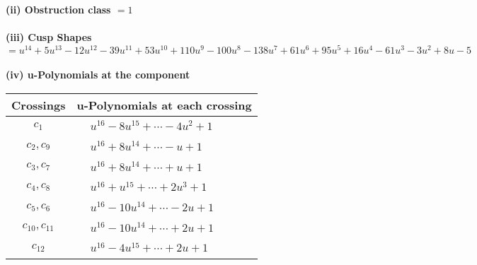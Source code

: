 \documentclass[1p]{elsarticle_modified}
\theoremstyle{definition}
\begin{document}
\flushleft \textbf{(ii) Obstruction class $= 1$}\\~\\
\flushleft \textbf{(iii) Cusp Shapes $= u^{14}+5 u^{13}-12 u^{12}-39 u^{11}+53 u^{10}+110 u^9-100 u^8-138 u^7+61 u^6+95 u^5+16 u^4-61 u^3-3 u^2+8 u-5$}\\~\\
\newpage\renewcommand{\arraystretch}{1}
\flushleft \textbf{(iv) u-Polynomials at the component}\newline \\
\begin{tabular}{m{50pt}|m{274pt}}
Crossings & \hspace{64pt}u-Polynomials at each crossing \\
\hline $$\begin{aligned}c_{1}\end{aligned}$$&$\begin{aligned}
&u^{16}-8 u^{15}+\cdots-4 u^2+1
\end{aligned}$\\
\hline $$\begin{aligned}c_{2},c_{9}\end{aligned}$$&$\begin{aligned}
&u^{16}+8 u^{14}+\cdots- u+1
\end{aligned}$\\
\hline $$\begin{aligned}c_{3},c_{7}\end{aligned}$$&$\begin{aligned}
&u^{16}+8 u^{14}+\cdots+u+1
\end{aligned}$\\
\hline $$\begin{aligned}c_{4},c_{8}\end{aligned}$$&$\begin{aligned}
&u^{16}+u^{15}+\cdots+2 u^3+1
\end{aligned}$\\
\hline $$\begin{aligned}c_{5},c_{6}\end{aligned}$$&$\begin{aligned}
&u^{16}-10 u^{14}+\cdots-2 u+1
\end{aligned}$\\
\hline $$\begin{aligned}c_{10},c_{11}\end{aligned}$$&$\begin{aligned}
&u^{16}-10 u^{14}+\cdots+2 u+1
\end{aligned}$\\
\hline $$\begin{aligned}c_{12}\end{aligned}$$&$\begin{aligned}
&u^{16}-4 u^{15}+\cdots+2 u+1
\end{aligned}$\\
\hline
\end{tabular}\\~\\
\end{document}
